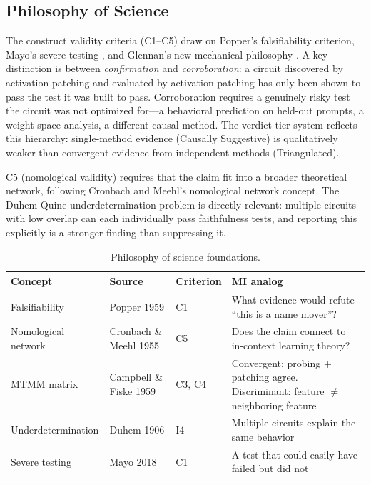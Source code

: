 \documentclass[10pt]{article}
\begin{document}
\subsection{Philosophy of Science}
\label{sec:phil-sci}

The construct validity criteria (C1--C5) draw on Popper's falsifiability criterion, Mayo's severe testing \citep{mayo2018statistical}, and Glennan's new mechanical philosophy \citep{glennan2017new}. A key distinction is between \emph{confirmation} and \emph{corroboration}: a circuit discovered by activation patching and evaluated by activation patching has only been shown to pass the test it was built to pass. Corroboration requires a genuinely risky test the circuit was not optimized for---a behavioral prediction on held-out prompts, a weight-space analysis, a different causal method. The verdict tier system reflects this hierarchy: single-method evidence (Causally Suggestive) is qualitatively weaker than convergent evidence from independent methods (Triangulated).

C5 (nomological validity) requires that the claim fit into a broader theoretical network, following Cronbach and Meehl's nomological network concept. The Duhem-Quine underdetermination problem is directly relevant: multiple circuits with low overlap can each individually pass faithfulness tests, and reporting this explicitly is a stronger finding than suppressing it.

\begin{table}[H]
\centering\small
\caption{Philosophy of science foundations.}
\renewcommand{\arraystretch}{1.12}
\begin{tabular}{@{}l>{\raggedright\arraybackslash}p{2cm}l>{\raggedright\arraybackslash}p{4.5cm}@{}}
\toprule
\textbf{Concept} & \textbf{Source} & \textbf{Criterion} & \textbf{MI analog} \\
\midrule
Falsifiability & Popper 1959 & C1 & What evidence would refute ``this is a name mover''? \\
\midrule
Nomological network & Cronbach \& Meehl 1955 & C5 & Does the claim connect to in-context learning theory? \\
\midrule
MTMM matrix & Campbell \& Fiske 1959 & C3, C4 & Convergent: probing + patching agree. Discriminant: feature $\neq$ neighboring feature \\
\midrule
Underdetermination & Duhem 1906 & I4 & Multiple circuits explain the same behavior \\
\midrule
Severe testing & Mayo 2018 & C1 & A test that could easily have failed but did not \\
\bottomrule
\end{tabular}
\end{table}
\end{document}
